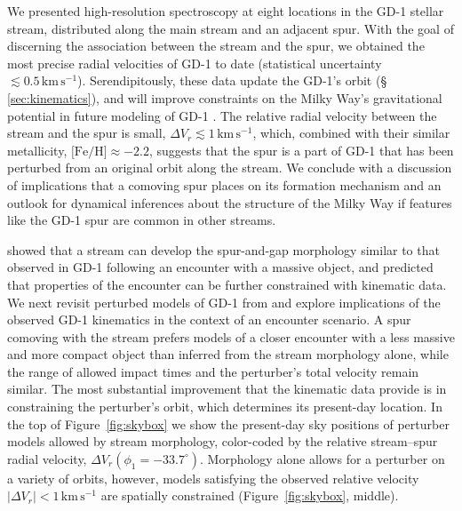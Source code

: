 \documentclass[twocolumn]{aastex63}
\newcommand{\kms}{\ensuremath{\textrm{km}\,\textrm{s}^{-1}}}
\newcommand{\feh}{\ensuremath{\textrm{[Fe/H]}}}
\begin{document}
We presented high-resolution spectroscopy at eight locations in the GD-1 stellar stream, distributed along the main stream and an adjacent spur.
With the goal of discerning the association between the stream and the spur, we obtained the most precise radial velocities of GD-1 to date (statistical uncertainty $\lesssim0.5\,\kms$).
Serendipitously, these data update the GD-1's orbit (\S\,\ref{sec:kinematics}), and will improve constraints on the Milky Way's gravitational potential in future modeling of GD-1 \citep[similar to, e.g.,][]{koposov2010, bowden2015, bovy2016}.
The relative radial velocity between the stream and the spur is small, $\Delta V_r\lesssim1\,\kms$, which, combined with their similar metallicity, $\feh\approx-2.2$, suggests that the spur is a part of GD-1 that has been perturbed from an original orbit along the stream.
We conclude with a discussion of implications that a comoving spur places on its formation mechanism and an outlook for dynamical inferences about the structure of the Milky Way if features like the GD-1 spur are common in other streams.


\citet{bonaca2019a} showed that a stream can develop the spur-and-gap morphology similar to that observed in GD-1 following an encounter with a massive object, and predicted that properties of the encounter can be further constrained with kinematic data.
We next revisit perturbed models of GD-1 from \citet{bonaca2019a} and explore implications of the observed GD-1 kinematics in the context of an encounter scenario.
A spur comoving with the stream prefers models of a closer encounter with a less massive and more compact object than inferred from the stream morphology alone, while the range of allowed impact times and the perturber's total velocity remain similar.
The most substantial improvement that the kinematic data provide is in constraining the perturber's orbit, which determines its present-day location.
In the top of Figure~\ref{fig:skybox} we show the present-day sky positions of perturber models allowed by stream morphology, color-coded by the relative stream--spur radial velocity, $\Delta V_r(\phi_1=-33.7^\circ)$.
Morphology alone allows for a perturber on a variety of orbits, however, models satisfying the observed relative velocity $|\Delta V_r|<1\,\kms$ are spatially constrained (Figure~\ref{fig:skybox}, middle).
\end{document}
